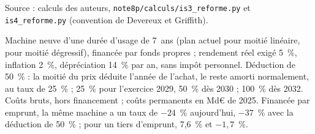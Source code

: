 Source : calculs des auteurs, \texttt{note8p/calculs/is3\_reforme.py} et \texttt{is4\_reforme.py} (convention de Devereux et Griffith).\par Machine neuve d'une durée d'usage de 7~ans (plan actuel pour moitié linéaire, pour moitié dégressif), financée par fonds propres ; rendement réel exigé 5~\%, inflation 2~\%, dépréciation 14~\% par an, sans impôt personnel. Déduction de 50~\% : la moitié du prix déduite l'année de l'achat, le reste amorti normalement, au taux de 25~\% ; 25~\% pour l'exercice 2029, 50~\% dès 2030 ; 100~\% dès 2032. Coûts bruts, hors financement ; coûts permanents en Md€ de 2025. Financée par emprunt, la même machine a un taux de $-24$~\% aujourd'hui, $-37$~\% avec la déduction de 50~\% ; pour un tiers d'emprunt, 7,6~\% et $-1{,}7$~\%.
